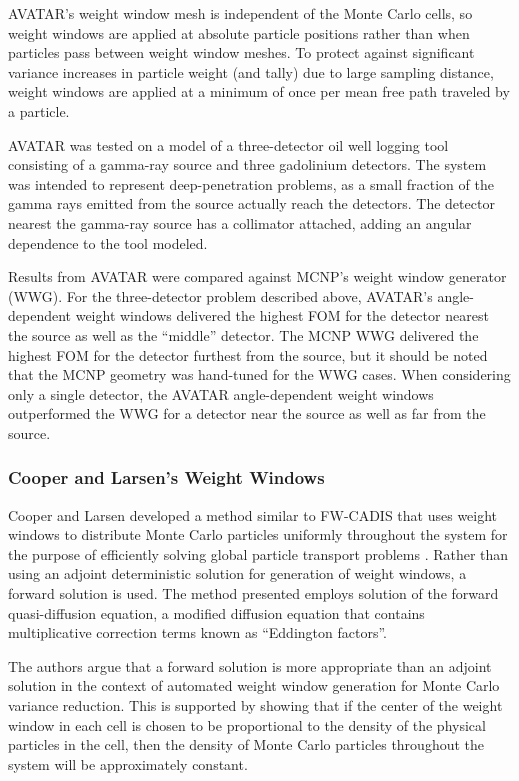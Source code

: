 AVATAR's weight window mesh is independent of the Monte Carlo cells, so weight 
windows are applied at absolute particle positions rather than when particles pass
between weight window meshes. To protect against significant variance increases in
particle weight (and tally) due to large sampling distance, weight windows are applied
at a minimum of once per mean free path traveled by a particle.

AVATAR was tested on a model of a three-detector oil well logging tool consisting of
a gamma-ray source and three gadolinium detectors. The system was intended to
represent deep-penetration problems, as a small fraction of the gamma rays emitted
from the source actually reach the detectors. The detector nearest the gamma-ray
source has a collimator attached, adding an angular dependence to the tool modeled. 

Results from AVATAR were compared against MCNP's weight window generator (WWG). For
the three-detector problem described above, AVATAR's angle-dependent weight windows
delivered the highest FOM for the detector nearest the source as well as the 
``middle'' detector. The MCNP WWG delivered the highest FOM for
the detector furthest from the source, but it should be noted that the MCNP geometry
was hand-tuned for the WWG cases. When considering only a single detector, the
AVATAR angle-dependent weight windows outperformed the WWG for a detector near the
source as well as far from the source.

\subsubsection{Cooper and Larsen's Weight Windows}

Cooper and Larsen developed a method similar to FW-CADIS that uses weight windows to
distribute Monte Carlo particles uniformly throughout the system for the purpose of
efficiently solving global particle transport problems \cite{clww}. Rather than using
an adjoint deterministic solution for generation of weight windows, a forward solution
is used. The method presented employs solution of the forward quasi-diffusion 
equation, a modified diffusion equation that contains multiplicative correction terms
known as ``Eddington factors''.

The authors argue that a forward solution is more appropriate than an adjoint solution
in the context of automated weight window generation for Monte Carlo variance
reduction. This is supported by showing that if the center of the weight window in
each cell is chosen to be proportional to the density of the physical particles in the
cell, then the density of Monte Carlo particles throughout the system will be
approximately constant.

